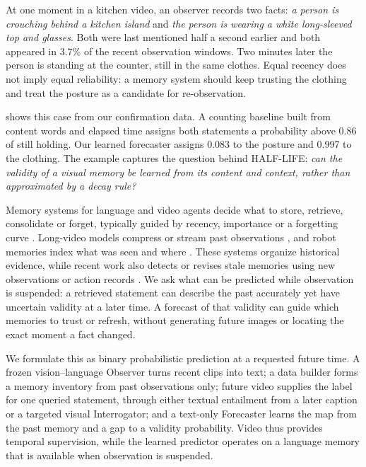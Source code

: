 \documentclass[10pt]{article}
\begin{document}
At one moment in a kitchen video, an observer records two facts: \emph{a person is crouching behind a kitchen island} and \emph{the person is wearing a white long-sleeved top and glasses}. Both were last mentioned half a second earlier and both appeared in 3.7\% of the recent observation windows. Two minutes later the person is standing at the counter, still in the same clothes. Equal recency does not imply equal reliability: a memory system should keep trusting the clothing and treat the posture as a candidate for re-observation.

 shows this case from our confirmation data. A counting baseline built from content words and elapsed time assigns both statements a probability above 0.86 of still holding. Our learned forecaster assigns 0.083 to the posture and 0.997 to the clothing. The example captures the question behind HALF-LIFE: \emph{can the validity of a visual memory be learned from its content and context, rather than approximated by a decay rule?}

Memory systems for language and video agents decide what to store, retrieve, consolidate or forget, typically guided by recency, importance or a forgetting curve \citep{packer2023memgpt,zhong2024memorybank}. Long-video models compress or stream past observations \citep{song2024moviechat,he2024malmm,chen2024videollmonline}, and robot memories index what was seen and where \citep{anwar2024remembr}. These systems organize historical evidence, while recent work also detects or revises stale memories using new observations or action records \citep{chao2026stale,sun2026memorylies,wang2026oldisnotfalse}. We ask what can be predicted while observation is suspended: a retrieved statement can describe the past accurately yet have uncertain validity at a later time. A forecast of that validity can guide which memories to trust or refresh, without generating future images or locating the exact moment a fact changed.

We formulate this as binary probabilistic prediction at a requested future time. A frozen vision--language Observer turns recent clips into text; a data builder forms a memory inventory from past observations only; future video supplies the label for one queried statement, through either textual entailment from a later caption or a targeted visual Interrogator; and a text-only Forecaster learns the map from the past memory and a gap to a validity probability. Video thus provides temporal supervision, while the learned predictor operates on a language memory that is available when observation is suspended.
\end{document}
